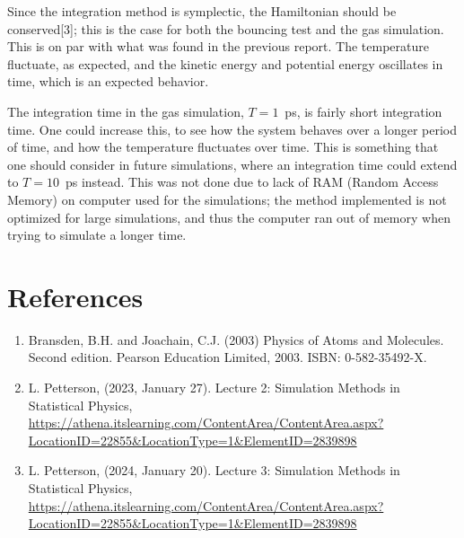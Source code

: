 \documentclass[a4paper]{article}
\newcommand{\newparagraph}{\vspace{.5cm}\noindent}
\begin{document}
\newparagraph
Since the integration method is symplectic, the Hamiltonian should be conserved[3]; this is the case for both the bouncing test and the gas simulation.
This is on par with what was found in the previous report. The temperature fluctuate, as expected, and the kinetic energy and potential energy oscillates in time, which is an expected behavior.

\newparagraph
The integration time in the gas simulation, $T = 1$~ps, is fairly short integration time. One could increase this, to see how the system behaves over a longer period of time, and how the temperature fluctuates over time.
This is something that one should consider in future simulations, where an integration time could extend to $T = 10$~ps instead.
This was not done due to lack of RAM (Random Access Memory) on computer used for the simulations; the method implemented is not optimized for large simulations, and thus the computer ran out of memory when trying to simulate a longer time.

\newpage
\section*{References}
\begin{enumerate}
    \item Bransden, B.H. and Joachain, C.J. (2003) Physics of Atoms and Molecules. Second edition. Pearson Education Limited, 2003. ISBN: 0-582-35492-X.
    \item L. Petterson, (2023, January 27). Lecture 2: Simulation Methods in Statistical Physics, \url{https://athena.itslearning.com/ContentArea/ContentArea.aspx?LocationID=22855&LocationType=1&ElementID=2839898}
    \item L. Petterson, (2024, January 20). Lecture 3: Simulation Methods in Statistical Physics, \url{https://athena.itslearning.com/ContentArea/ContentArea.aspx?LocationID=22855&LocationType=1&ElementID=2839898}
\end{enumerate}
\end{document}
